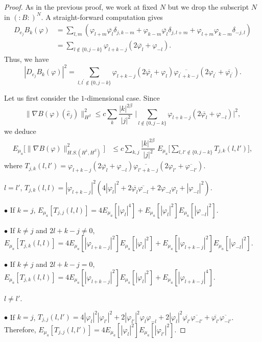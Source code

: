 \documentclass[10pt,a4paper]{amsart}
\begin{document}
\begin{proof}
As in the previous proof, we work at fixed $N$ but we drop the subscript $N$ in $(:B:)^N$.
A straight-forward computation gives  
\begin{align*}
D_{e_j} B_k (\varphi)&
= \sum_{l,m} (\varphi_{l+m} \overline{\varphi_l} \delta_{j,k-m}+ \varphi_{k-m} \overline{\varphi_l} \delta_{j,l+m}+ \varphi_{l+m} \varphi_{k-m} \delta_{-j,l}) \\
&=  \sum_{l\notin \{ 0, j-k\}} \varphi_{l+k-j} ( 2\overline{\varphi_l} + \varphi_{-l}).  
\end{align*}
Thus, we have
$$|D_{e_j} B_k (\varphi)|^2 = \sum_{l,l^\prime \notin \{ 0, j-k\}} \varphi_{l+k-j} (2 \overline{\varphi_l}+ \varphi_l )  \overline{\varphi_{l^\prime+k-j}} (2\varphi_{l^\prime}+ \overline{\varphi_{l^\prime}}) .$$

Let us first consider  the $1$-dimensional case. Since
$$\|\nabla B(\varphi) (\hat{e}_j)\|_{H^\beta}^2 \leq c \sum_{k} \dfrac{|k|^{2\beta}}{|j|^{2}}\;  \Big| \sum_{l\notin \{ 0, j-k\}}
 \varphi_{l+k-j}  (2 \overline{\varphi_l} + \varphi_{-l})  \Big|^2, $$
 we deduce
\begin{align*}
E_{\mu_a} \big[ \|\nabla B (\varphi)\|^2_{H.S. (H^1 ,H^\beta) }\big] &\leq  c \sum_{k,j} \dfrac{|k|^{2\beta}}{|j|^{2}} \;  E_{\mu_a} \Big[ \sum_{l,l'\notin \{0,  j-k\}}   T_{j,k}(l,l')\Big],
\end{align*}
 where $T_{j,k}(l,l')=\varphi_{l+k-j}  (2\overline{\varphi_l} +\varphi_{-l}) \overline{\varphi_{l'+k-j}} (2 \varphi_{l'} + \overline{\varphi_{-l'}}) $.
\bigskip

 $l=l'$, $T_{j,k}(l,l) = |\varphi_{l+k-j}|^2 (4 |\varphi_l|^2 + 2 \overline{\varphi_{l}} \overline{\varphi_{-l}} + 2 \varphi_{-l} \varphi_l  + |\varphi_{-l}|^2)$. 

\;  $\bullet$ If $k=j$, $E_{\mu_a}[T_{j,j}(l,l) ]=4  E_{\mu_a}[  |\varphi_l|^4 ] + E_{\mu_a} [|\varphi_l|^2 ] E_{\mu_a} [ |\varphi_{-l}|^2]$. 

\;  $\bullet$ If $k\neq j$ and $2l+k-j\neq 0$, $E_{\mu_a}[T_{j,k}(l,l) ] = 4 E_{\mu_a}[|\varphi_{l+k-j}|^2] E_{\mu_a}[ |\varphi_l|^2 ] + E_{\mu_a}[|\varphi_{l+k-j}|^2]  E_{\mu_a} [|\varphi_{-l}|^2] $. 

\;  $\bullet$ If  $k\neq j$ and $2l+k-j=  0$, $E_{\mu_a}[T_{j,k}(l,l) ]=  4 E_{\mu_a}[|\varphi_{l+k-j}|^2] E_{\mu_a}[ |\varphi_l|^2 ]  + E_{\mu_a}[|\varphi_{l+k-j}|^4]$.  
\bigskip

 $l\neq l'$. 

\indent $\bullet$ If $k=j$,  $T_{j,j}(l,l') = 4  |\varphi_l|^2   |\varphi_{l'}|^2 + 2 |\varphi_{l'}|^2 \varphi_l  \varphi_{-l}  + 2 |\varphi_l|^2 \overline{\varphi_{l'}} \overline {\varphi_{-l'}}
+ \overline{ \varphi_{l'}} \overline{ \varphi_{-l'}}$.  Therefore,
$E_{\mu_a}[ T_{j,j}(l,l') ] = 4  E_{\mu_a} [ |\varphi_l|^2]  E_{\mu_a}[  |\varphi_{l'}|^2]$.  


\end{proof}
\end{document}
